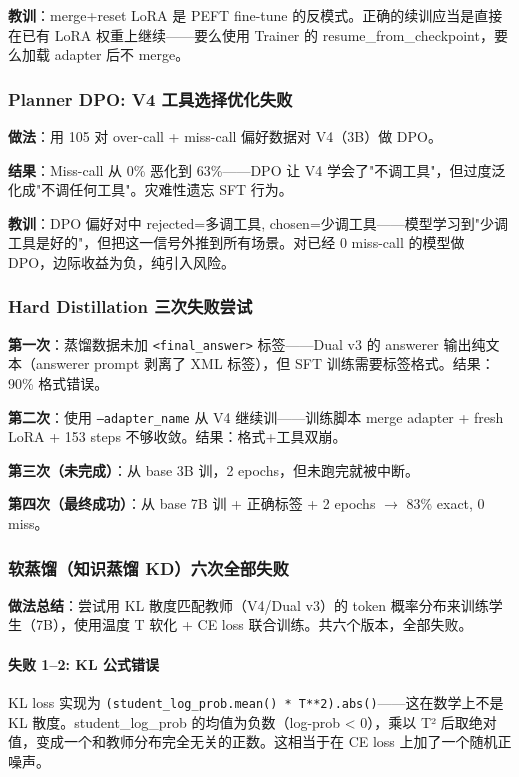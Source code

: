 \documentclass[12pt,a4paper]{ctexart}
\begin{document}
\textbf{教训}：merge+reset LoRA 是 PEFT fine-tune 的反模式。正确的续训应当是直接在已有 LoRA 权重上继续——要么使用 Trainer 的 resume\_from\_checkpoint，要么加载 adapter 后不 merge。

\subsubsection{Planner DPO: V4 工具选择优化失败}

\textbf{做法}：用 105 对 over-call + miss-call 偏好数据对 V4（3B）做 DPO。

\textbf{结果}：Miss-call 从 0\% 恶化到 63\%——DPO 让 V4 学会了"不调工具"，但过度泛化成"不调任何工具"。灾难性遗忘 SFT 行为。

\textbf{教训}：DPO 偏好对中 rejected=多调工具, chosen=少调工具——模型学习到"少调工具是好的"，但把这一信号外推到所有场景。对已经 0 miss-call 的模型做 DPO，边际收益为负，纯引入风险。

\subsubsection{Hard Distillation 三次失败尝试}

\textbf{第一次}：蒸馏数据未加 \texttt{<final\_answer>} 标签——Dual v3 的 answerer 输出纯文本（answerer prompt 剥离了 XML 标签），但 SFT 训练需要标签格式。结果：90\% 格式错误。

\textbf{第二次}：使用 \texttt{--adapter\_name} 从 V4 继续训——训练脚本 merge adapter + fresh LoRA + 153 steps 不够收敛。结果：格式+工具双崩。

\textbf{第三次（未完成）}：从 base 3B 训，2 epochs，但未跑完就被中断。

\textbf{第四次（最终成功）}：从 base 7B 训 + 正确标签 + 2 epochs $\rightarrow$ 83\% exact, 0 miss。

\subsubsection{软蒸馏（知识蒸馏 KD）六次全部失败}

\textbf{做法总结}：尝试用 KL 散度匹配教师（V4/Dual v3）的 token 概率分布来训练学生（7B），使用温度 T 软化 + CE loss 联合训练。共六个版本，全部失败。

\paragraph*{失败 1--2: KL 公式错误}

KL loss 实现为 \texttt{(student\_log\_prob.mean() * T**2).abs()}——这在数学上不是 KL 散度。student\_log\_prob 的均值为负数（log-prob < 0），乘以 T² 后取绝对值，变成一个和教师分布完全无关的正数。这相当于在 CE loss 上加了一个随机正噪声。
\end{document}
